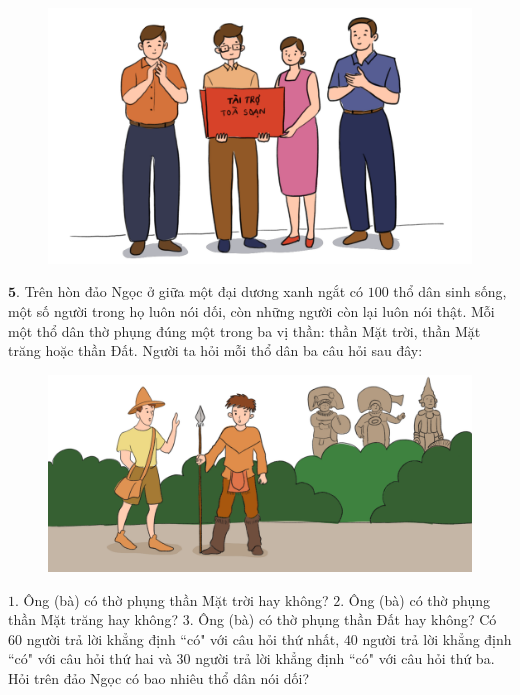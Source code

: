 \begin{multicols}{2}
\begin{figure}[H]
		\centering
		\captionsetup{labelformat= empty, justification=centering}
		\includegraphics[width=0.8\linewidth]{Hinh4}
		\vspace*{-10pt}
	\end{figure}
	\vskip 0.1cm
	$\pmb{5.}$ 	Trên hòn đảo Ngọc ở giữa một đại dương xanh ngắt có $100$ thổ dân sinh sống, một số người trong họ luôn nói dối, còn những người còn lại luôn nói thật. Mỗi một thổ dân thờ phụng đúng một trong ba vị thần: thần Mặt trời, thần Mặt trăng hoặc thần Đất. Người ta hỏi mỗi thổ dân ba câu hỏi sau đây:
	\begin{figure}[H]
		\centering
		\vspace*{-5pt}
		\captionsetup{labelformat= empty, justification=centering}
		\includegraphics[width=1\linewidth]{Hinh5}
		\vspace*{-20pt}
	\end{figure}
	$1.$ Ông (bà) có thờ phụng thần Mặt trời hay không?
	\vskip 0.1cm
	$2.$ Ông (bà) có thờ phụng thần Mặt trăng hay không?
	\vskip 0.1cm
	$3.$ Ông (bà) có thờ phụng thần Đất hay không?
	\vskip 0.1cm
	Có $60$ người trả lời khẳng định ``có" với câu hỏi thứ nhất, $40$ người trả lời khẳng định ``có" với câu hỏi thứ hai và $30$ người trả lời khẳng định ``có" với câu hỏi thứ ba. Hỏi trên đảo Ngọc có bao nhiêu thổ dân nói dối?

\end{multicols}
